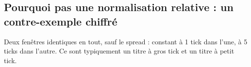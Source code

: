 \subsection{Pourquoi pas une normalisation relative : un contre-exemple chiffré}
Deux fenêtres identiques en tout, sauf le spread : constant à 1 tick dans l'une, à 5 ticks dans l'autre. Ce sont typiquement un titre à gros tick et un titre à petit tick.
\begin{table}[H]\centering\small

\caption{L'ancienne représentation (relative à la médiane locale) ne distingue pas les deux fenêtres (Proposition~\ref{prop:scale}). Les colonnes en ticks les séparent sans ambiguïté.}
\label{tab:exscale}
\end{table}
